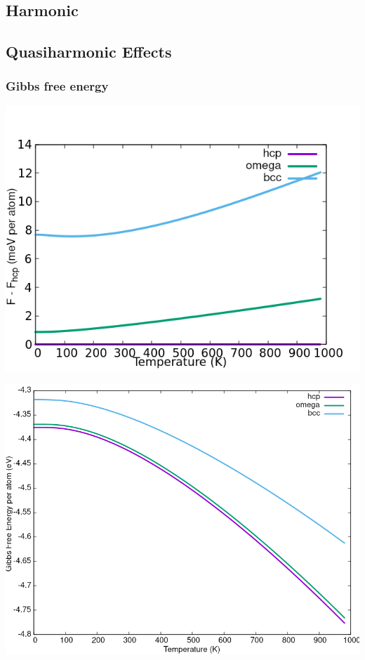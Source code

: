 \documentclass[11pt]{article}
\begin{document}
\subsection{Harmonic}
\label{sec:orgb70a34f}

\subsection{Quasiharmonic Effects}
\label{sec:orgde302a7}

\subsubsection{Gibbs free energy}
\label{sec:orgc9de7a5}

\begin{center}
\includegraphics[width=.9\linewidth]{Images/gibbs_free_energy_per_atom_2020-04-02.png}
\end{center}
\begin{center}
\includegraphics[width=.9\linewidth]{Images/gibbs_free_energy_per_atom_2020-04-02_4x4x4.png}
\end{center}
\end{document}
